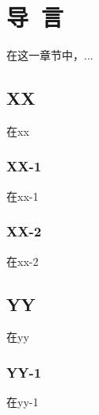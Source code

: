 
\chapter{导~言}
在这一章节中，...

\section{XX}
在xx

\subsection{XX-1}
在xx-1
\subsection{XX-2}
在xx-2

\section{YY}
在yy
\subsection{YY-1}
在yy-1
